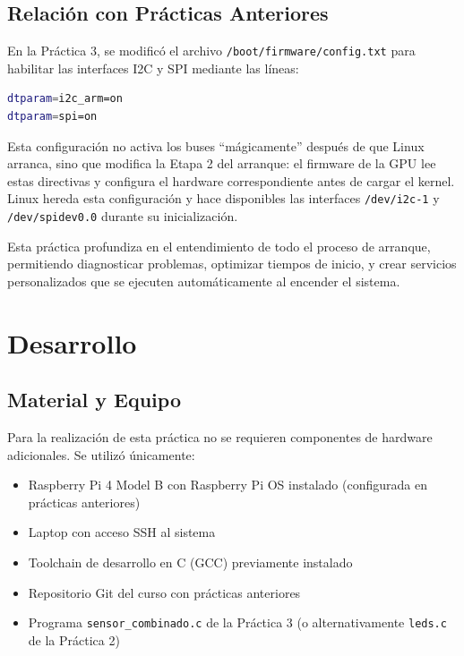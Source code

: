 \documentclass[conference]{IEEEtran}
\begin{document}
\subsection{Relación con Prácticas Anteriores}

En la Práctica 3, se modificó el archivo \texttt{/boot/firmware/config.txt} para habilitar las interfaces I2C y SPI mediante las líneas:

\begin{lstlisting}[language=bash]
dtparam=i2c_arm=on
dtparam=spi=on
\end{lstlisting}

Esta configuración no activa los buses ``mágicamente'' después de que Linux arranca, sino que modifica la Etapa 2 del arranque: el firmware de la GPU lee estas directivas y configura el hardware correspondiente antes de cargar el kernel. Linux hereda esta configuración y hace disponibles las interfaces \texttt{/dev/i2c-1} y \texttt{/dev/spidev0.0} durante su inicialización.

Esta práctica profundiza en el entendimiento de todo el proceso de arranque, permitiendo diagnosticar problemas, optimizar tiempos de inicio, y crear servicios personalizados que se ejecuten automáticamente al encender el sistema.

\section{Desarrollo}

\subsection{Material y Equipo}

Para la realización de esta práctica no se requieren componentes de hardware adicionales. Se utilizó únicamente:

\begin{itemize}
	\item Raspberry Pi 4 Model B con Raspberry Pi OS instalado (configurada en prácticas anteriores)
	\item Laptop con acceso SSH al sistema
	\item Toolchain de desarrollo en C (GCC) previamente instalado
	\item Repositorio Git del curso con prácticas anteriores
	\item Programa \texttt{sensor\_combinado.c} de la Práctica 3 (o alternativamente \texttt{leds.c} de la Práctica 2)
\end{itemize}
\end{document}
